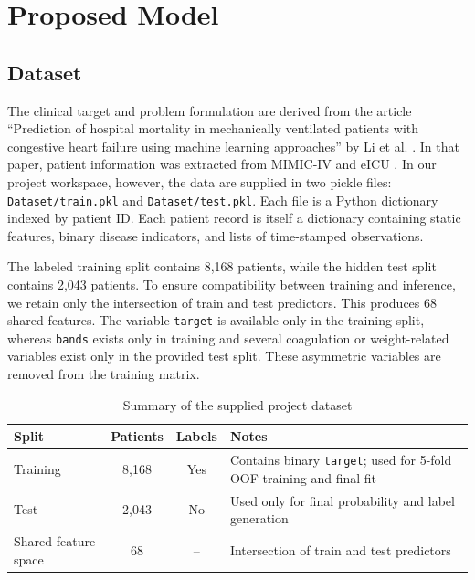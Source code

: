 \documentclass[a4paper,12pt]{extreport}
\begin{document}
\chapter{Proposed Model}

\section{Dataset}
The clinical target and problem formulation are derived from the article ``Prediction of hospital mortality in mechanically ventilated patients with congestive heart failure using machine learning approaches'' by Li et al. \cite{li2022prediction}. In that paper, patient information was extracted from MIMIC-IV and eICU \cite{johnson2021mimiciv,pollard2018eicu}. In our project workspace, however, the data are supplied in two pickle files: \texttt{Dataset/train.pkl} and \texttt{Dataset/test.pkl}. Each file is a Python dictionary indexed by patient ID. Each patient record is itself a dictionary containing static features, binary disease indicators, and lists of time-stamped observations.

The labeled training split contains 8{,}168 patients, while the hidden test split contains 2{,}043 patients. To ensure compatibility between training and inference, we retain only the intersection of train and test predictors. This produces 68 shared features. The variable \texttt{target} is available only in the training split, whereas \texttt{bands} exists only in training and several coagulation or weight-related variables exist only in the provided test split. These asymmetric variables are removed from the training matrix.

\begin{table}[H]
    \centering
    \caption{Summary of the supplied project dataset}
    \label{tab:data_summary}
    \begin{tabularx}{\textwidth}{lccX}
        \toprule
        \textbf{Split} & \textbf{Patients} & \textbf{Labels} & \textbf{Notes} \\
        \midrule
        Training & 8{,}168 & Yes & Contains binary \texttt{target}; used for 5-fold OOF training and final fit \\
        Test & 2{,}043 & No & Used only for final probability and label generation \\
        Shared feature space & 68 & -- & Intersection of train and test predictors \\
        \bottomrule
    \end{tabularx}
\end{table}
\end{document}
